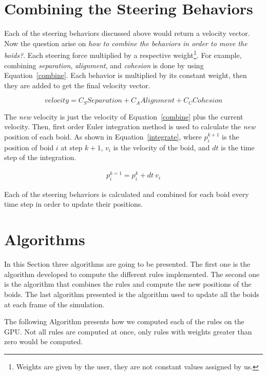 \section{Combining the Steering Behaviors}
Each of the steering behaviors discussed above would return a velocity vector. Now the question arise on \textit{how to combine the behaviors in order to move the boids?}. Each steering force multiplied by a respective weight\footnote{Weights are given by the user, they are not constant values assigned by us.}. For example, combining \textit{separation}, \textit{alignment}, and \textit{cohesion} is done by using Equation~\ref{combine}. Each behavior is multiplied by its constant weight, then they are added to get the final velocity vector.

\begin{equation}
\label{combine}
velocity = C_S Separation  + C_A Alignment  + C_C Cohesion 
\end{equation}

The \textit{new} velocity is just the velocity of Equation~\ref{combine} plus the current velocity. Then, first order Euler integration method is used  to calculate the \textit{new} position of each boid. As shown in Equation~\ref{integrate}, where $p_i^{k+1}$ is the position of boid $i$ at step $k+1$, $v_i$ is the velocity of the boid, and $dt$ is the time step of the integration.

\begin{align}
\label{integrate}
p_i^{k=1} = p_i^k + dt~ v_i
\end{align}

Each of the steering behaviors is calculated and combined for each boid every time step in order to update their positions.

\section{Algorithms}

In this Section three algorithms are going to be presented. The first one is the algorithm developed to compute the different rules implemented. The second one is the algorithm that combines the rules and compute the new positions of the boids. The last algorithm presented is the algorithm used to update all the boids at each frame of the simulation. 


The following Algorithm presents how we computed each of the rules on the GPU. Not all rules are computed at once, only rules with weights greater than zero would be computed.

